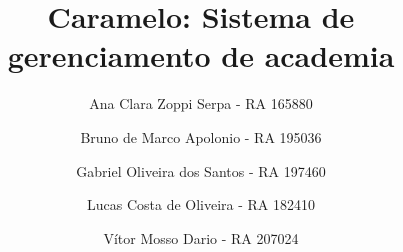 \documentclass[11pt,twoside]{article}
\begin{document}
%

%



\TRMakeCover


%

%
\title{Caramelo: Sistema de gerenciamento de academia}

\author{
Ana Clara Zoppi Serpa - RA 165880
\and
Bruno de Marco Apolonio - RA 195036
\and
Gabriel Oliveira dos Santos - RA 197460
\and
Lucas Costa de Oliveira - RA 182410
\and
Vítor Mosso Dario - RA 207024
}

\date{}

\maketitle

\end{document}
